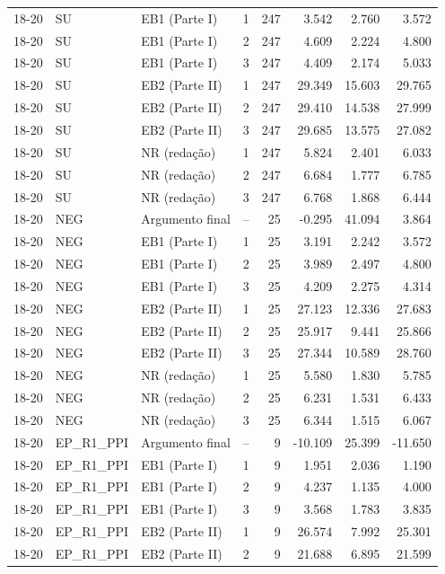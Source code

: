\begin{longtable}{lllcrrrr}
18-20 & SU & EB1 (Parte I) & 1 & 247 & 3.542 & 2.760 & 3.572 \\
18-20 & SU & EB1 (Parte I) & 2 & 247 & 4.609 & 2.224 & 4.800 \\
18-20 & SU & EB1 (Parte I) & 3 & 247 & 4.409 & 2.174 & 5.033 \\
18-20 & SU & EB2 (Parte II) & 1 & 247 & 29.349 & 15.603 & 29.765 \\
18-20 & SU & EB2 (Parte II) & 2 & 247 & 29.410 & 14.538 & 27.999 \\
18-20 & SU & EB2 (Parte II) & 3 & 247 & 29.685 & 13.575 & 27.082 \\
18-20 & SU & NR (redação) & 1 & 247 & 5.824 & 2.401 & 6.033 \\
18-20 & SU & NR (redação) & 2 & 247 & 6.684 & 1.777 & 6.785 \\
18-20 & SU & NR (redação) & 3 & 247 & 6.768 & 1.868 & 6.444 \\
18-20 & NEG & Argumento final & -- & 25 & -0.295 & 41.094 & 3.864 \\
18-20 & NEG & EB1 (Parte I) & 1 & 25 & 3.191 & 2.242 & 3.572 \\
18-20 & NEG & EB1 (Parte I) & 2 & 25 & 3.989 & 2.497 & 4.800 \\
18-20 & NEG & EB1 (Parte I) & 3 & 25 & 4.209 & 2.275 & 4.314 \\
18-20 & NEG & EB2 (Parte II) & 1 & 25 & 27.123 & 12.336 & 27.683 \\
18-20 & NEG & EB2 (Parte II) & 2 & 25 & 25.917 & 9.441 & 25.866 \\
18-20 & NEG & EB2 (Parte II) & 3 & 25 & 27.344 & 10.589 & 28.760 \\
18-20 & NEG & NR (redação) & 1 & 25 & 5.580 & 1.830 & 5.785 \\
18-20 & NEG & NR (redação) & 2 & 25 & 6.231 & 1.531 & 6.433 \\
18-20 & NEG & NR (redação) & 3 & 25 & 6.344 & 1.515 & 6.067 \\
18-20 & EP\_R1\_PPI & Argumento final & -- & 9 & -10.109 & 25.399 & -11.650 \\
18-20 & EP\_R1\_PPI & EB1 (Parte I) & 1 & 9 & 1.951 & 2.036 & 1.190 \\
18-20 & EP\_R1\_PPI & EB1 (Parte I) & 2 & 9 & 4.237 & 1.135 & 4.000 \\
18-20 & EP\_R1\_PPI & EB1 (Parte I) & 3 & 9 & 3.568 & 1.783 & 3.835 \\
18-20 & EP\_R1\_PPI & EB2 (Parte II) & 1 & 9 & 26.574 & 7.992 & 25.301 \\
18-20 & EP\_R1\_PPI & EB2 (Parte II) & 2 & 9 & 21.688 & 6.895 & 21.599 \\

\end{longtable}

